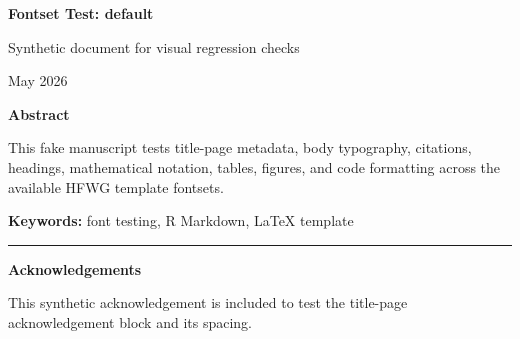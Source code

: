 \documentclass[12pt]{article}
\newif\ifhfwganon
\begin{document}
\begin{titlepage}
\thispagestyle{empty}

\vspace*{0.14\textheight}
\begin{center}


{\LARGE\bfseries Fontset Test: default\par}

\vspace{0.25em}
{\large Synthetic document for visual regression checks\par}

\vspace{2em}

\begin{singlespace}
{\normalsize

\hfwgauthorblock

\par\vspace{2\baselineskip}
\hfwgseriesblock

\ifhfwganon\else
\vspace{0.5em}
{\small May 2026}\par
\fi

}
\end{singlespace}


\vspace{2em}

\begin{minipage}{0.8\textwidth}
\small\singlespacing
\textbf{Abstract}\par\vspace{0.25em}
This fake manuscript tests title-page metadata, body typography,
citations, headings, mathematical notation, tables, figures, and code
formatting across the available HFWG template fontsets.
\par\vspace{1em}
\noindent\textbf{Keywords: }font testing, R Markdown, LaTeX template
\end{minipage}

\vfill

\ifhfwganon\else
\begin{minipage}{0.8\textwidth}
\footnotesize\singlespacing
\noindent\rule{0.3\textwidth}{0.4pt}\par
\textbf{Acknowledgements}\par
This synthetic acknowledgement is included to test the title-page
acknowledgement block and its spacing.
\end{minipage}
\fi

\end{center}
\end{titlepage}
\fi\fi
\fi\fi
\end{document}
